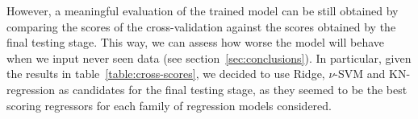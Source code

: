 However, a meaningful evaluation of the trained model can be still obtained by comparing the scores of the cross-validation against the scores obtained by the final testing stage.
This way, we can assess how worse the model will behave when we input never seen data (see section~\ref{sec:conclusions}).
In particular, given the results in table~\ref{table:cross-scores}, we decided to use Ridge, $\nu$-SVM and KN-regression as candidates for the final testing stage, as they seemed to be the best scoring regressors for each family of regression models considered.
